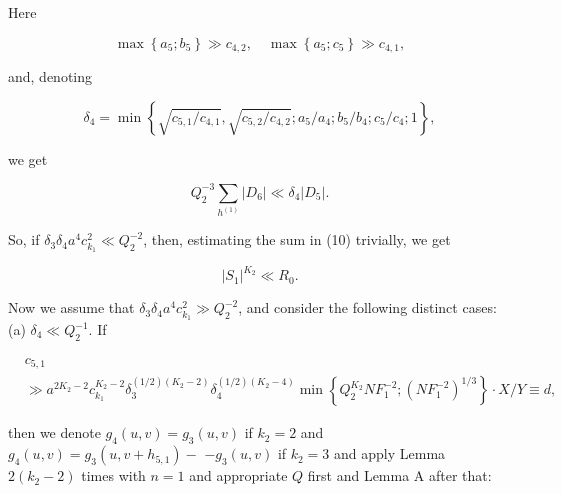 \documentclass[10pt]{article}
\begin{document}
Here

$$
\max \left\{a_{5} ; b_{5}\right\} \gg c_{4,2}, \quad \max \left\{a_{5} ; c_{5}\right\} \gg c_{4,1},
$$

and, denoting

$$
\delta_{4}=\min \left\{\sqrt{c_{5,1} / c_{4,1}}, \sqrt{c_{5,2} / c_{4,2}} ; a_{5} / a_{4} ; b_{5} / b_{4} ; c_{5} / c_{4} ; 1\right\},
$$

we get

$$
Q_{2}^{-3} \sum_{h^{(1)}}\left|D_{6}\right| \ll \delta_{4}\left|D_{5}\right| .
$$

So, if $\delta_{3} \delta_{4} a^{4} c_{k_{1}}^{2} \ll Q_{2}^{-2}$, then, estimating the sum in (10) trivially, we get

$$
\left|S_{1}\right|^{K_{2}} \ll R_{0} .
$$

Now we assume that $\delta_{3} \delta_{4} a^{4} c_{k_{1}}^{2} \gg Q_{2}^{-2}$, and consider the following distinct cases:\\
(a) $\delta_{4} \ll Q_{2}^{-1}$. If

$$
\begin{aligned}
& c_{5,1} \\
& \gg a^{2 K_{2}-2} c_{k_{1}}^{K_{2}-2} \delta_{3}^{(1 / 2)\left(K_{2}-2\right)} \delta_{4}^{(1 / 2)\left(K_{2}-4\right)} \min \left\{Q_{2}^{K_{2}} N F_{1}^{-2} ;\left(N F_{1}^{-2}\right)^{1 / 3}\right\} \cdot X / Y \equiv d,
\end{aligned}
$$

then we denote $g_{4}(u, v)=g_{3}(u, v)$ if $k_{2}=2$ and $g_{4}(u, v)=g_{3}\left(u, v+h_{5,1}\right)-$ $-g_{3}(u, v)$ if $k_{2}=3$ and apply Lemma $2\left(k_{2}-2\right)$ times with $n=1$ and appropriate $Q$ first and Lemma A after that:
\end{document}
